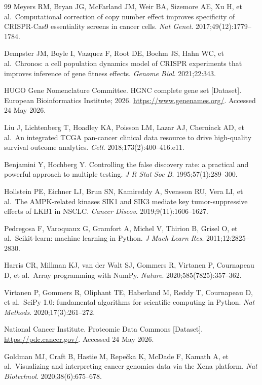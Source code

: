 \documentclass[11pt,a4paper]{article}
\begin{document}
\begin{thebibliography}{99}
 Meyers RM, Bryan JG, McFarland JM, Weir BA, Sizemore AE, Xu H, et al.\ Computational correction of copy number effect improves specificity of CRISPR-Cas9 essentiality screens in cancer cells. \textit{Nat Genet}. 2017;49(12):1779--1784.

 Dempster JM, Boyle I, Vazquez F, Root DE, Boehm JS, Hahn WC, et al.\ Chronos: a cell population dynamics model of CRISPR experiments that improves inference of gene fitness effects. \textit{Genome Biol}. 2021;22:343.

 HUGO Gene Nomenclature Committee. HGNC complete gene set [Dataset]. European Bioinformatics Institute; 2026. \url{https://www.genenames.org/}. Accessed 24 May 2026.

 Liu J, Lichtenberg T, Hoadley KA, Poisson LM, Lazar AJ, Cherniack AD, et al.\ An integrated TCGA pan-cancer clinical data resource to drive high-quality survival outcome analytics. \textit{Cell}. 2018;173(2):400--416.e11.

 Benjamini Y, Hochberg Y. Controlling the false discovery rate: a practical and powerful approach to multiple testing. \textit{J R Stat Soc B}. 1995;57(1):289--300.

 Hollstein PE, Eichner LJ, Brun SN, Kamireddy A, Svensson RU, Vera LI, et al.\ The AMPK-related kinases SIK1 and SIK3 mediate key tumor-suppressive effects of LKB1 in NSCLC. \textit{Cancer Discov}. 2019;9(11):1606--1627.

 Pedregosa F, Varoquaux G, Gramfort A, Michel V, Thirion B, Grisel O, et al.\ Scikit-learn: machine learning in Python. \textit{J Mach Learn Res}. 2011;12:2825--2830.

 Harris CR, Millman KJ, van der Walt SJ, Gommers R, Virtanen P, Cournapeau D, et al.\ Array programming with NumPy. \textit{Nature}. 2020;585(7825):357--362.

 Virtanen P, Gommers R, Oliphant TE, Haberland M, Reddy T, Cournapeau D, et al.\ SciPy 1.0: fundamental algorithms for scientific computing in Python. \textit{Nat Methods}. 2020;17(3):261--272.

 National Cancer Institute. Proteomic Data Commons [Dataset]. \url{https://pdc.cancer.gov/}. Accessed 24 May 2026.

 Goldman MJ, Craft B, Hastie M, Repe\v{c}ka K, McDade F, Kamath A, et al.\ Visualizing and interpreting cancer genomics data via the Xena platform. \textit{Nat Biotechnol}. 2020;38(6):675--678.
\end{thebibliography}
\end{document}
